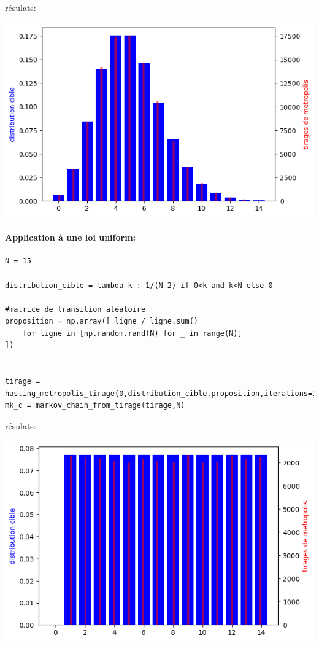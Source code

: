 \documentclass{article}
\begin{document}
résulats:

\includegraphics[scale=0.5]{poisson.png}

\newpage
\paragraph{Application à une loi uniform:}

\begin{verbatim}
N = 15

distribution_cible = lambda k : 1/(N-2) if 0<k and k<N else 0

#matrice de transition aléatoire
proposition = np.array([ ligne / ligne.sum()
    for ligne in [np.random.rand(N) for _ in range(N)]
])


tirage = hasting_metropolis_tirage(0,distribution_cible,proposition,iterations=100_000)
mk_c = markov_chain_from_tirage(tirage,N)
\end{verbatim}

résulats:

\includegraphics[scale=0.5]{uniforme.png}
\end{document}
